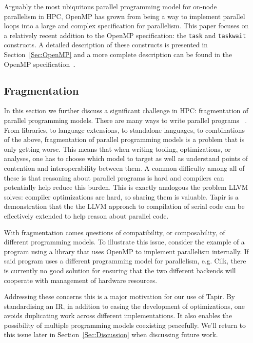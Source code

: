 \documentclass[sigconf]{acmart}
\begin{document}
Arguably the most ubiquitous parallel programming model for on-node parallelism
in HPC, OpenMP has grown from being a way to implement parallel loops into a
large and complex specification for parallelism. This paper focuses on a 
relatively recent addition to the OpenMP specification: the \texttt{task}
and \texttt{taskwait} constructs. A detailed description of these constructs
is presented in Section~\ref{Sec:OpenMP} and a more complete description can 
be found in the OpenMP specification~\cite{openmp}.

\subsection{Fragmentation}

In this section we further discuss a significant challenge in HPC:
fragmentation of parallel programming models. There are many ways to write
parallel programs~\cite{openmp, qthreads, chapel, cilk, kokkos, legion, upc,
mpi} . From libraries, to language extensions, to standalone languages, to
combinations of the above, fragmentation of parallel programming models is a
problem that is only getting worse. This means that when writing tooling,
optimizations, or analyses, one has to choose which model to target as well as
understand points of contention and interoperability between them. A common
difficulty among all of these is that reasoning about parallel programs is hard
and compilers can potentially help reduce this burden. This is exactly
analogous the problem LLVM solves: compiler optimizations are hard, so sharing
them is valuable. Tapir is a demonstration that the the LLVM approach to
compilation of serial code can be effectively extended to help reason about
parallel code. 

With fragmentation comes questions of compatibility, or composability, of 
different programming models. To illustrate this issue, consider the example of
a program using a library that uses OpenMP to implement parallelism internally. 
If said program uses a different programming model for parallelism, e.g. Cilk,
there is currently no good solution for ensuring that the two different backends
will cooperate with management of hardware resources. 

Addressing these concerns this is a major motivation for our use of Tapir.  By
standardising an IR, in addition to easing the development of optimizations,
one avoids duplicating work across different implementations. It also enables
the possibility of multiple programming models coexisting peacefully. We'll
return to this issue later in Section~\ref{Sec:Discussion} when discussing
future work.
\end{document}
